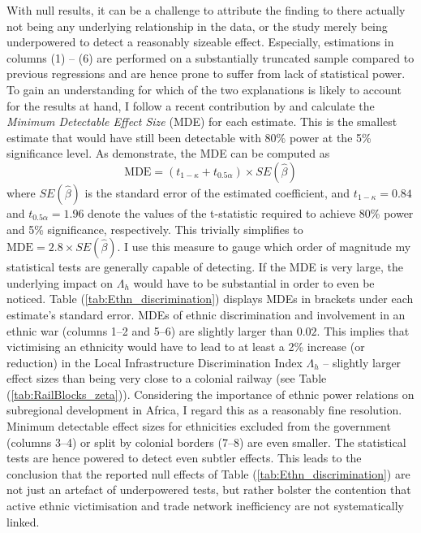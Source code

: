\documentclass[11pt, oneside]{article}   	%
\let\oldref\ref
\renewcommand{\ref}[1]{(\oldref{#1})}
\begin{document}
With null results, it can be a challenge to attribute the finding to there actually not being any underlying relationship in the data, or the study merely being underpowered to detect a reasonably sizeable effect. Especially, estimations in columns (1) -- (6) are performed on a substantially truncated sample compared to previous regressions and are hence prone to suffer from lack of statistical power. To gain an understanding for which of the two explanations is likely to account for the results at hand, I follow a recent contribution by \cite{Haushofer_ShorttermImpactUnconditional_2016} and calculate the \emph{Minimum Detectable Effect Size} (MDE) for each estimate. This is the smallest estimate that would have still been detectable with 80\% power at the 5\% significance level. As \cite{Haushofer_ShorttermImpactUnconditional_2016} demonstrate, the MDE can be computed as
\begin{equation*}
  \textrm{MDE} = (t_{1-\kappa}+t_{0.5\alpha}) \times SE(\hat{\beta})
\end{equation*}
where $SE(\hat{\beta})$ is the standard error of the estimated coefficient, and $t_{1-\kappa}=0.84$ and $t_{0.5\alpha}=1.96$ denote the values of the t-statistic required to achieve 80\% power and 5\% significance, respectively. This trivially simplifies to $\textrm{MDE} = 2.8 \times SE(\hat{\beta})$. I use this measure to gauge which order of magnitude my statistical tests are generally capable of detecting. If the MDE is very large, the underlying impact on $\Lambda_{h}$ would have to be substantial in order to even be noticed. Table \ref{tab:Ethn_discrimination} displays MDEs in brackets under each estimate's standard error. MDEs of ethnic discrimination and involvement in an ethnic war (columns 1--2 and 5--6) are slightly larger than $0.02$. This implies that victimising an ethnicity would have to lead to at least a 2\% increase (or reduction) in the Local Infrastructure Discrimination Index $\Lambda_{h}$ -- slightly larger effect sizes than being very close to a colonial railway (see Table \ref{tab:RailBlocks_zeta}). Considering the importance of ethnic power relations on subregional development in Africa, I regard this as a reasonably fine resolution. Minimum detectable effect sizes for ethnicities excluded from the government (columns 3--4) or split by colonial borders (7--8) are even smaller. The statistical tests are hence powered to detect even subtler effects. This leads to the conclusion that the reported null effects of Table \ref{tab:Ethn_discrimination} are not just an artefact of underpowered tests, but rather bolster the contention that active ethnic victimisation and trade network inefficiency are not systematically linked.
\end{document}
